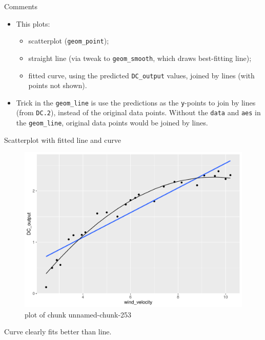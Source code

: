 \documentclass[ignorenonframetext,]{beamer}
\providecommand{\tightlist}{%
  \setlength{\itemsep}{0pt}\setlength{\parskip}{0pt}}
\begin{document}
\begin{frame}[fragile]{Comments}
\protect\hypertarget{comments-15}{}

\begin{itemize}
\tightlist
\item
  This plots:

  \begin{itemize}
  \tightlist
  \item
    scatterplot (\texttt{geom\_point});
  \item
    straight line (via tweak to \texttt{geom\_smooth}, which draws
    best-fitting line);
  \item
    fitted curve, using the predicted \texttt{DC\_output} values, joined
    by lines (with points not shown).
  \end{itemize}
\item
  Trick in the \texttt{geom\_line} is use the predictions as the
  \texttt{y}-points to join by lines (from \texttt{DC.2}), instead of
  the original data points. Without the \texttt{data} and \texttt{aes}
  in the \texttt{geom\_line}, original data points would be joined by
  lines.
\end{itemize}

\end{frame}

\begin{frame}{Scatterplot with fitted line and curve}
\protect\hypertarget{scatterplot-with-fitted-line-and-curve-1}{}

\begin{figure}
\centering
\includegraphics{figure/unnamed-chunk-253-1.pdf}
\caption{plot of chunk unnamed-chunk-253}
\end{figure}

Curve clearly fits better than line.

\end{frame}
\end{document}
